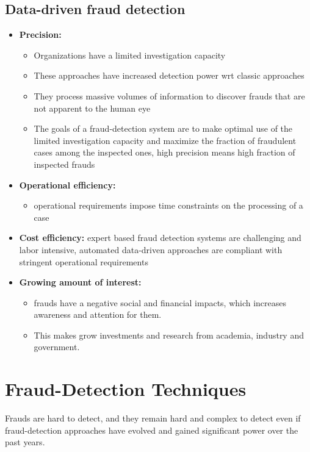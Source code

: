     \subsection{Data-driven fraud detection}
        \begin{itemize}
            \item \textbf{Precision:}
            \begin{itemize}
                \item Organizations have a limited investigation capacity
                \item These approaches have increased detection power wrt classic approaches
                \item They process massive volumes of information to discover frauds that are not apparent to the human eye
                \item The goals of a fraud-detection system are to make optimal use of the limited investigation capacity and maximize the fraction of fraudulent cases among the inspected ones, high precision means high fraction of inspected frauds
            \end{itemize}
            \item \textbf{Operational efficiency:}
            \begin{itemize}
                \item operational requirements impose time constraints on the processing of a case
            \end{itemize} 
            \item \textbf{Cost efficiency:} expert based fraud detection systems are challenging and labor intensive, automated data-driven approaches are compliant with stringent operational requirements
            \item \textbf{Growing amount of interest:} 
            \begin{itemize}
                \item frauds have a negative social and financial impacts, which increases awareness and attention for them.
                \item This makes grow investments and research from academia, industry and government.
            \end{itemize}
        \end{itemize}
\section{Fraud-Detection Techniques}
    Frauds are hard to detect, and they remain hard and complex to detect even if fraud-detection approaches have evolved and gained significant power over the past years.
